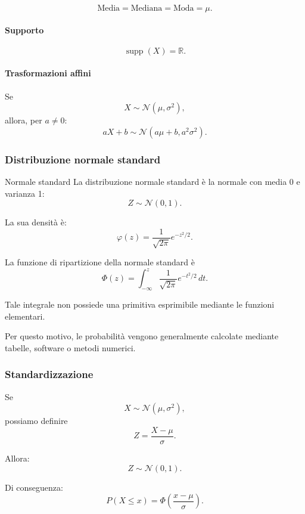 \[
\boxed{
\text{Media}=\text{Mediana}=\text{Moda}=\mu.
}
\]

\paragraph{Supporto}

\[
\operatorname{supp}(X)=\mathbb{R}.
\]

\paragraph{Trasformazioni affini}

Se
\[
X\sim\mathcal{N}(\mu,\sigma^2),
\]
allora, per $a\neq0$:
\[
aX+b
\sim
\mathcal{N}(a\mu+b,a^2\sigma^2).
\]

\subsubsection{Distribuzione normale standard}

\begin{definition}{Normale standard}
La distribuzione normale standard
è la normale con media 0
e varianza 1:
\[
\boxed{
Z\sim\mathcal{N}(0,1).
}
\]

La sua densità è:
\[
\boxed{
\varphi(z)
=
\frac1{\sqrt{2\pi}}e^{-z^2/2}.
}
\]
\end{definition}

La funzione di ripartizione
della normale standard è
\[
\boxed{
\Phi(z)
=
\int_{-\infty}^{z}
\frac1{\sqrt{2\pi}}e^{-t^2/2}\,dt.
}
\]

Tale integrale non possiede
una primitiva esprimibile
mediante le funzioni elementari.

Per questo motivo,
le probabilità vengono generalmente
calcolate mediante tabelle,
software o metodi numerici.

\subsubsection{Standardizzazione}

Se
\[
X\sim\mathcal{N}(\mu,\sigma^2),
\]
possiamo definire
\[
\boxed{
Z=\frac{X-\mu}{\sigma}.
}
\]

Allora:
\[
\boxed{
Z\sim\mathcal{N}(0,1).
}
\]

Di conseguenza:
\[
P(X\leq x)
=
\Phi\left(\frac{x-\mu}{\sigma}\right).
\]

